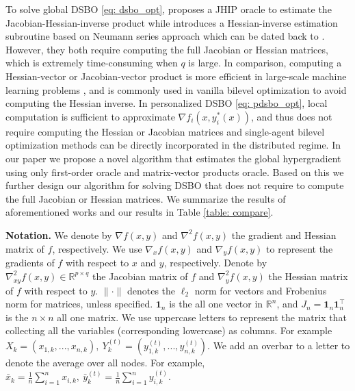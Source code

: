 \documentclass{article}
\theoremstyle{plain}
\theoremstyle{definition}
\theoremstyle{remark}
\begin{document}
To solve global DSBO \eqref{eq: dsbo_opt}, \citet{chen2022decentralized} proposes a JHIP oracle to estimate the Jacobian-Hessian-inverse product while \citet{yang2022decentralized} introduces a Hessian-inverse estimation subroutine based on Neumann series approach which can be dated back to \citet{ghadimi2018approximation}. However, they both require computing the full Jacobian or Hessian matrices, which is extremely time-consuming when $q$ is large. In comparison, computing a Hessian-vector or Jacobian-vector product is more efficient in large-scale machine learning problems \citep{bottou2018optimization}, and is commonly used in vanilla bilevel optimization \citep{ghadimi2018approximation, ji2021bilevel, chen2021closing} to avoid computing the Hessian inverse.  In personalized DSBO \eqref{eq: pdsbo_opt}, local computation is sufficient to approximate $\nabla f_i(x,y_i^*(x))$, and thus does not require computing the  Hessian or Jacobian matrices and single-agent bilevel optimization methods can be directly incorporated in the distributed regime. In our paper we propose a novel algorithm that estimates the global hypergradient using only first-order oracle and matrix-vector products oracle. Based on this we further design our algorithm for solving DSBO that does not require to compute the full Jacobian or Hessian matrices. We summarize the results of aforementioned works and our results in Table \ref{table: compare}.

{\bf Notation.}
We denote by $\nabla f(x,y)$ and $\nabla^2f(x,y)$ the gradient and Hessian matrix of $f$, respectively. We use $\nabla_x f(x,y)$ and $\nabla_y f(x,y)$ to represent the gradients of $f$ with respect to $x$ and $y$, respectively. Denote by $\nabla_{xy}^2f(x,y)\in\mathbb{R}^{p\times q}$ the Jacobian matrix of $f$ and $\nabla_y^2f(x,y)$ the Hessian matrix of $f$ with respect to $y$. $\|\cdot\|$ denotes the $\ell_2$ norm for vectors and Frobenius norm for matrices, unless specified. $\mathbf{1}_n$ is the all one vector in $\mathbb{R}^{n}$, and $J_n = \mathbf{1}_n\mathbf{1}_n^{\top}$ is the $n\times n$ all one matrix. We use uppercase letters to represent the matrix that collecting all the variables (corresponding lowercase) as columns. For example $X_k = \left(x_{1,k}, ..., x_{n,k}\right),\ Y_k^{(t)} = \left(y_{1,k}^{(t)},...,y_{n,k}^{(t)}\right)$. We add an overbar to a letter to denote the average over all nodes. For example, $\bar{x}_k = \frac{1}{n}\sum_{i=1}^{n}x_{i,k},\ \bar{y}_{k}^{(t)} = \frac{1}{n}\sum_{i=1}^{n}y_{i,k}^{(t)}$.
\end{document}

